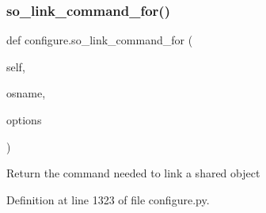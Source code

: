 \subsubsection{\texorpdfstring{so\+\_\+link\+\_\+command\+\_\+for()}{so\_link\_command\_for()}}
{\footnotesize\ttfamily def configure.\+so\+\_\+link\+\_\+command\+\_\+for (\begin{DoxyParamCaption}\item[{}]{self,  }\item[{}]{osname,  }\item[{}]{options }\end{DoxyParamCaption})}

\begin{DoxyVerb}Return the command needed to link a shared object
\end{DoxyVerb}
 

Definition at line 1323 of file configure.\+py.

